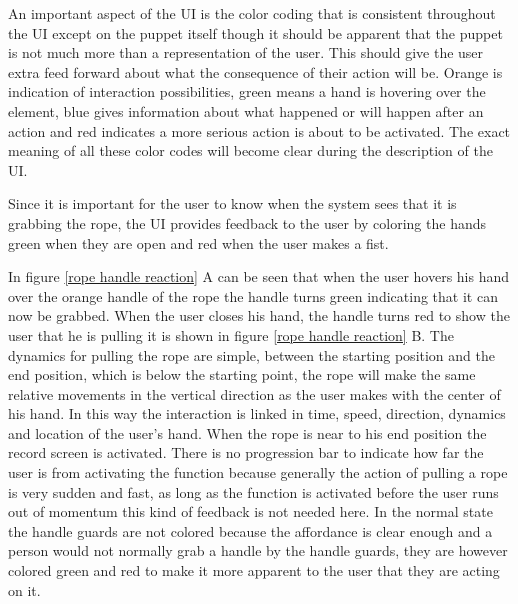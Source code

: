 An important aspect of the UI is the color coding that is consistent throughout the UI except on the puppet itself though it should be apparent that the puppet is not much more than a representation of the user. This should give the user extra feed forward about what the consequence of their action will be. Orange is indication of interaction possibilities, green means a hand is hovering over the element, blue gives information about what happened or will happen after an action and red indicates a more serious action is about to be activated. The exact meaning of all these color codes will become clear during the description of the UI.

Since it is important for the user to know when the system sees that it is grabbing the rope, the UI provides feedback to the user by coloring the hands green when they are open and red when the user makes a fist.

In figure \ref{rope handle reaction} A can be seen that when the user hovers his hand over the orange handle of the rope the handle turns green indicating that it can now be grabbed. When the user closes his hand, the handle turns red to show the user that he is pulling it is shown in figure \ref{rope handle reaction} B. The dynamics for pulling the rope are simple, between the starting position and the end position, which is below the starting point, the rope will make the same relative movements in the vertical direction as the user makes with the center of his hand. In this way the interaction is linked in time, speed, direction, dynamics and location of the user's hand. When the rope is near to his end position the record screen is activated. There is no progression bar to indicate how far the user is from activating the function because generally the action of pulling a rope is very sudden and fast, as long as the function is activated before the user runs out of momentum this kind of feedback is not needed here. In the normal state the handle guards are not colored because the affordance is clear enough and a person would not normally grab a handle by the handle guards, they are however colored green and red to make it more apparent to the user that they are acting on it. 

